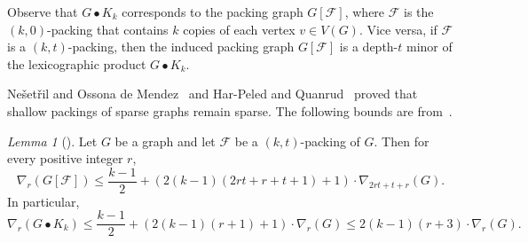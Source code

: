 \documentclass[1p,number,a4paper]{elsarticle}
\theoremstyle{remark}
\newcommand{\Ff}{\mathcal{F}}
\newtheorem{lemma}[theorem]{Lemma}
\begin{document}
Observe that $G\bullet K_k$ corresponds to the packing graph
$G[\Ff]$, where $\Ff$ is the $(k,0)$-packing that contains 
$k$ copies of each vertex $v\in V(G)$.
Vice versa, if $\mathcal{F}$ is a $(k,t)$-packing, then the induced packing graph $G[\mathcal{F}]$ is a depth-$t$ minor of the lexicographic product $G\bullet K_k$.

\smallskip
Ne\v{s}et\v{r}il and Ossona de 
Mendez~\cite{nevsetril2012sparsity}
and Har-Peled and Quanrud~\cite{har2017approximation} proved that shallow packings of sparse 
graphs remain sparse. The following bounds are from~\cite{notes}.
 

\newcommand{\Ed}{E_{\mathrm{d}}}
\newcommand{\End}{E_{\mathrm{nd}}}

\begin{lemma}[\cite{notes}]\label{lem:packingdensity}
Let $G$ be a graph and let $\mathcal{F}$ be a $(k, t)$-packing of $G$. 
Then for every positive integer $r$, \[\nabla_r(G[\mathcal{F}])\leq \frac{k-1}{2}+(2(k-1)(2rt+r+t+1)+1)\cdot \nabla_{2rt+t+r}(G).\]
In particular, 
\[\nabla_r(G\bullet K_k)\leq \frac{k-1}{2}+(2(k-1)(r+1)+1)\cdot \nabla_{r}(G)\leq 2(k-1)(r+3)\cdot \nabla_r(G).\]
\end{lemma}
%
\end{document}
